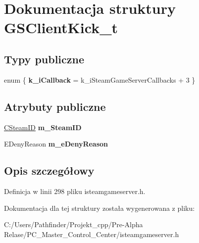 \hypertarget{struct_g_s_client_kick__t}{}\section{Dokumentacja struktury G\+S\+Client\+Kick\+\_\+t}
\label{struct_g_s_client_kick__t}
\subsection*{Typy publiczne}
\begin{DoxyCompactItemize}
\item 
\mbox{\label{struct_g_s_client_kick__t_a60dc3437e6a418244006ed4857bf24b5}} 
enum \{ {\bfseries k\+\_\+i\+Callback} = k\+\_\+i\+Steam\+Game\+Server\+Callbacks + 3
 \}
\end{DoxyCompactItemize}
\subsection*{Atrybuty publiczne}
\begin{DoxyCompactItemize}
\item 
\mbox{\label{struct_g_s_client_kick__t_a7c5ef2c586c7a23ce900fd5c7d8c5622}} 
\hyperlink{class_c_steam_i_d}{C\+Steam\+ID} {\bfseries m\+\_\+\+Steam\+ID}
\item 
\mbox{\label{struct_g_s_client_kick__t_a4db1ea7163ff721fc348aa27b8c7a256}} 
E\+Deny\+Reason {\bfseries m\+\_\+e\+Deny\+Reason}
\end{DoxyCompactItemize}


\subsection{Opis szczegółowy}


Definicja w linii 298 pliku isteamgameserver.\+h.



Dokumentacja dla tej struktury została wygenerowana z pliku\+:\begin{DoxyCompactItemize}
\item 
C\+:/\+Users/\+Pathfinder/\+Projekt\+\_\+cpp/\+Pre-\/\+Alpha Relase/\+P\+C\+\_\+\+Master\+\_\+\+Control\+\_\+\+Center/isteamgameserver.\+h\end{DoxyCompactItemize}
